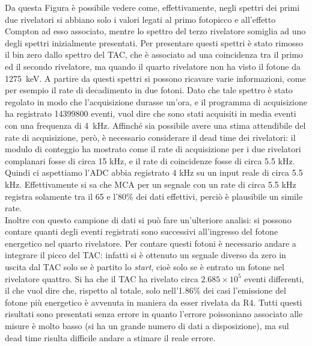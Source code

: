 Da questa Figura è possibile vedere come, effettivamente, negli spettri dei primi due rivelatori si abbiano solo i valori legati al primo fotopicco e all'effetto Compton ad
esso associato, mentre lo spettro del terzo rivelatore somiglia ad uno degli spettri inizialmente presentati. Per presentare questi spettri è stato rimosso il bin zero
dallo spettro del TAC, che è associato ad una coincidenza tra il primo ed il secondo rivelatore, ma quando il quarto rivelatore non ha visto il fotone da 1275~keV. A partire
da questi spettri si possono ricavare varie informazioni, come per esempio il rate di decadimento in due fotoni. Dato che tale spettro è stato regolato in modo che
l'acquisizione durasse un'ora, e il programma di acquisizione ha registrato 14399800 eventi, vuol dire che sono stati acquisiti in media eventi con una frequenza di 4~kHz.
Affinché sia possibile avere una stima attendibile del rate di acquisizione, però, è necessario considerare il dead time dei rivelatori: il modulo di conteggio ha mostrato
come il rate di acquisizione per i due rivelatori complanari fosse di circa 15 kHz, e il rate di coincidenze fosse di circa 5.5 kHz. Quindi ci aspettiamo l'ADC abbia
registrato 4 kHz su un input reale di circa 5.5 kHz. Effettivamente si sa che MCA per un segnale con un rate di circa 5.5 kHz registra solamente tra il 65 e l'80\% dei dati
effettivi, perciò è plausibile un simile rate.\\

Inoltre con questo campione di dati si può fare un'ulteriore analisi: si possono contare quanti degli eventi registrati sono successivi all'ingresso del fotone energetico
nel quarto rivelatore. Per contare questi fotoni è necessario andare a integrare il picco del TAC: infatti si è ottenuto un segnale diverso da zero in uscita dal TAC solo
se è partito lo \textit{start}, cioè solo se è entrato un fotone nel rivelatore quattro. Si ha che il TAC ha rivelato circa $2.685 \times 10^5$ eventi differenti, il che vuol
dire che, rispetto al totale, solo nell'1.86\% dei casi l'emissione del fotone più energetico è avvenuta in maniera da esser rivelata da R4. Tutti questi risultati sono presentati senza errore in quanto l'errore poissoniano
associato alle misure è molto basso (si ha un grande numero di dati a disposizione), ma sul dead time risulta difficile andare a stimare il reale errore.\\

\FloatBarrier
